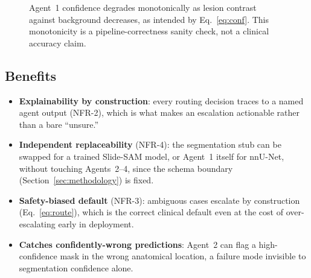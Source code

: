 \documentclass[11pt,a4paper]{article}
\begin{document}
\begin{figure}[htbp]
\centering
{}
\caption{Agent~1 confidence degrades monotonically as lesion contrast against background decreases, as intended by Eq.~\ref{eq:conf}. This monotonicity is a pipeline-correctness sanity check, not a clinical accuracy claim.}
\label{fig:confbar}
\end{figure}

\subsection{Benefits}
\begin{itemize}[leftmargin=1.4em]
    \item \textbf{Explainability by construction}: every routing decision traces to a named agent output (NFR-2), which is what makes an escalation actionable rather than a bare ``unsure.''
    \item \textbf{Independent replaceability} (NFR-4): the segmentation stub can be swapped for a trained Slide-SAM model, or Agent~1 itself for nnU-Net, without touching Agents~2--4, since the schema boundary (Section~\ref{sec:methodology}) is fixed.
    \item \textbf{Safety-biased default} (NFR-3): ambiguous cases escalate by construction (Eq.~\ref{eq:route}), which is the correct clinical default even at the cost of over-escalating early in deployment.
    \item \textbf{Catches confidently-wrong predictions}: Agent~2 can flag a high-confidence mask in the wrong anatomical location, a failure mode invisible to segmentation confidence alone.
\end{itemize}
\end{document}
